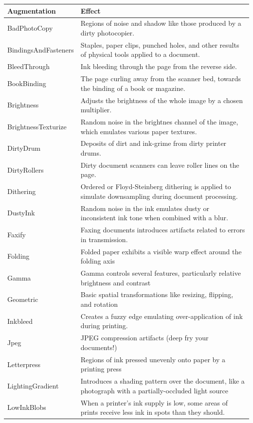 \documentclass[runningheads]{article}
\begin{document}
\begin{center}
\begin{tabular}{ll}
Augmentation & Effect\\
\hline
BadPhotoCopy & Regions of noise and shadow like those produced by a dirty photocopier.\\
BindingsAndFasteners & Staples, paper clips, punched holes, and other results of physical tools applied to a document.\\
BleedThrough & Ink bleeding through the page from the reverse side.\\
BookBinding & The page curling away from the scanner bed, towards the binding of a book or magazine.\\
Brightness & Adjusts the brightness of the whole image by a chosen multiplier.\\
BrightnessTexturize & Random noise in the brightnes channel of the image, which emulates various paper textures.\\
DirtyDrum & Deposits of dirt and ink-grime from dirty printer drums.\\
DirtyRollers & Dirty document scanners can leave roller lines on the page.\\
Dithering & Ordered or Floyd-Steinberg dithering is applied to simulate downsampling during document processing.\\
DustyInk & Random noise in the ink emulates dusty or inconsistent ink tone when combined with a blur.\\
Faxify & Faxing documents introduces artifacts related to errors in transmission.\\
Folding & Folded paper exhibits a visible warp effect around the folding axis\\
Gamma & Gamma controls several features, particularly relative brightness and contrast\\
Geometric & Basic spatial transformations like resizing, flipping, and rotation\\
Inkbleed & Creates a fuzzy edge emulating over-application of ink during printing.\\
Jpeg & JPEG compression artifacts (deep fry your documents!)\\
Letterpress & Regions of ink pressed unevenly onto paper by a printing press\\
LightingGradient & Introduces a shading pattern over the document, like a photograph with a partially-occluded light source\\
LowInkBlobs & When a printer's ink supply is low, some areas of prints receive less ink in spots than they should.\\

\end{tabular}
\end{center}
\end{document}
